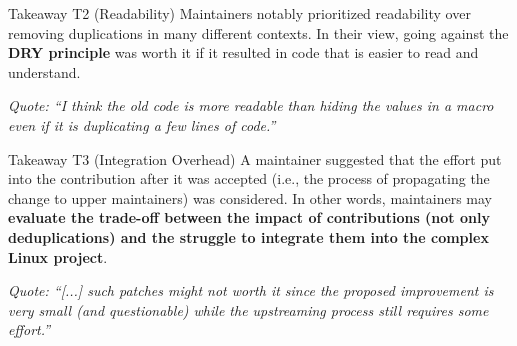 \documentclass[10pt,conference]{IEEEtran}
\newenvironment{highlight-box}[1]{%
  \begin{tcolorbox}
  \textbf{#1:} \itshape}{\end{tcolorbox}}
\begin{document}
\begin{highlight-box}{Takeaway T2 (Readability)}
  Maintainers notably prioritized readability over removing duplications in
  many different contexts. In their view, going against the \textbf{DRY
  principle} was worth it if it resulted in code that is easier to read and
  understand.
\hfill\\

\noindent
\begin{footnotesize}
\textit{
  Quote: ``I think the old code is more readable than hiding the values in a macro
  even if it is duplicating a few lines of code.''
}
\end{footnotesize}
\end{highlight-box}


\begin{highlight-box}{Takeaway T3 (Integration Overhead)}
  A maintainer suggested that the effort put into the contribution after it was
  accepted (i.e., the process of propagating the change to upper maintainers)
  was considered. In other words, maintainers may \textbf{evaluate the
  trade-off between the impact of contributions (not only deduplications) and
  the struggle to integrate them into the complex Linux project}.
\hfill\\

\noindent
\begin{footnotesize}
\textit{
  Quote: ``[...] such patches might not worth it since the proposed
  improvement is very small (and questionable) while the upstreaming process
  still requires some effort.''
}
\end{footnotesize}
\end{highlight-box}
\end{document}

